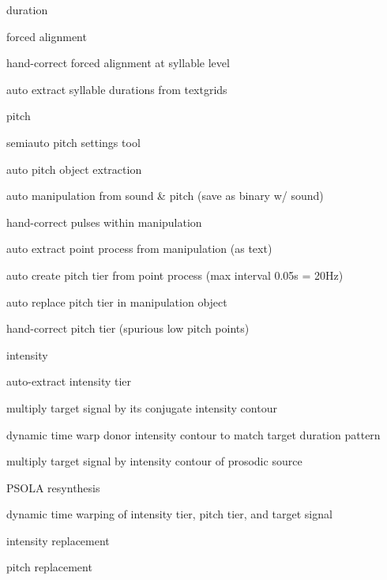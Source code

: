 \begin{itm}
	\item{duration}
	\begin{itm}
		\item{forced alignment}
		\item{hand-correct forced alignment at syllable level}
		\item{auto extract syllable durations from textgrids}
	\end{itm}
	\item{pitch}
	\begin{itm}
		\item{semiauto pitch settings tool}
		\item{auto pitch object extraction}
		\item{auto manipulation from sound \& pitch (save as binary w/ sound)}
		\item{hand-correct pulses within manipulation}
		\item{auto extract point process from manipulation (as text)}
		\item{auto create pitch tier from point process (max interval 0.05s = 20Hz)}
		\item{auto replace pitch tier in manipulation object}
		\item{hand-correct pitch tier (spurious low pitch points)}
	\end{itm}
	\item{intensity}
	\begin{itm}
		\item{auto-extract intensity tier}
		\item{multiply target signal by its conjugate intensity contour}
		\item{dynamic time warp donor intensity contour to match target duration pattern}
		\item{multiply target signal by intensity contour of prosodic source}
	\end{itm}
	\item{PSOLA resynthesis}
	\begin{itm}
		\item{dynamic time warping of intensity tier, pitch tier, and target signal}
		\item{intensity replacement}
		\item{pitch replacement}
	\end{itm}	
\end{itm}



